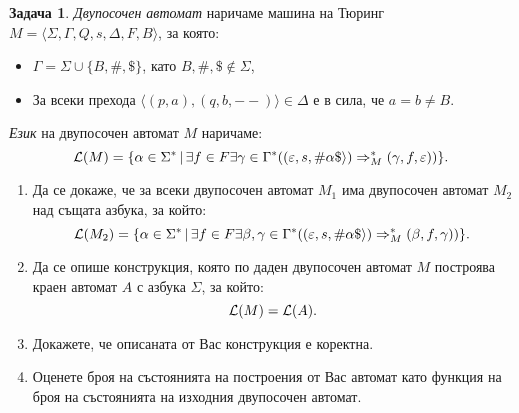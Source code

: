 \documentclass[a4paper]{article}
\theoremstyle{definition}
\newtheorem{problem}{Задача}
\begin{document}
\begin{problem}
\emph{Двупосочен автомат} наричаме машина на Тюринг $M=\langle \Sigma,\Gamma,Q,s,\Delta,F,B\rangle$, за която:
\begin{itemize}
\item $\Gamma=\Sigma\cup \{B,\#,\$\}$, като $B,\#,\$\not\in \Sigma$,
\item За всеки прехода $\langle (p,a),(q,b,--)\rangle\in \Delta$ е в сила, че $a=b\neq B$.
\end{itemize}
\emph{Език} на двупосочен автомат $M$ наричаме:
\begin{equation*}
{\cal L}(M)=\{\alpha\in \Sigma^*\,|\,\exists f\in F\exists \gamma\in \Gamma^*( (\varepsilon,s,\#\alpha\$\rangle)\Rightarrow^*_M (\gamma,f,\varepsilon))\}.
\end{equation*}
\begin{enumerate}
\item Да се докаже, че за всеки двупосочен автомат $M_1$ има двупосочен автомат $M_2$ над същата азбука, за който:
\begin{equation*}
{\cal L}(M_2) = \{\alpha\in \Sigma^* \,|\, \exists f\in F\exists \beta,\gamma\in \Gamma^*((\varepsilon,s,\#\alpha\$\rangle)\Rightarrow^*_M (\beta,f,\gamma))\}.
\end{equation*}
\item Да се опише конструкция, която по даден двупосочен автомат $M$ построява краен автомат $A$ с азбука $\Sigma$, за който:
\begin{equation*}
{\cal L}(M)={\cal L}(A).
\end{equation*}
\item Докажете, че описаната от Вас конструкция е коректна. 
\item Оценете броя на състоянията на построения от Вас автомат като функция на броя
на състоянията на изходния двупосочен автомат.
\end{enumerate}
\end{problem}
\end{document}
